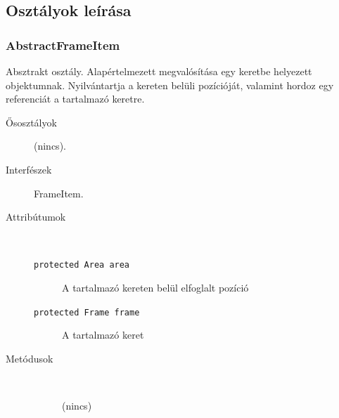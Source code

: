 	\subsection{Osztályok leírása}
	
		\subsubsection{AbstractFrameItem} Absztrakt osztály.
				 Alapértelmezett megvalósítása egy keretbe helyezett objektumnak.   Nyilvántartja a kereten belüli pozícióját, valamint hordoz  egy referenciát a tartalmazó keretre. 			\begin{description}


				\item[Ősosztályok] (nincs).
				\item[Interfészek] FrameItem.
				\item[Attribútumok]$\ $
					\begin{description}
						\item[\texttt{protected Area area}] A tartalmazó kereten belül elfoglalt pozíció 
						\item[\texttt{protected Frame frame}] A tartalmazó keret 
					\end{description}
				\item[Metódusok]$\ $
					\begin{description}
						\item[] (nincs)
					\end{description}
			\end{description}


